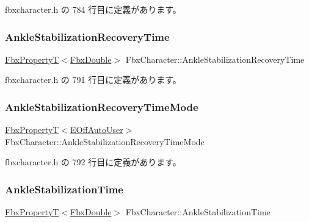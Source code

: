  fbxcharacter.\+h の 784 行目に定義があります。

\mbox{\label{class_fbx_character_a8eb3285bb3a9fadedc4ccef79e97dda0}} 
\subsubsection{\texorpdfstring{Ankle\+Stabilization\+Recovery\+Time}{AnkleStabilizationRecoveryTime}}
{\footnotesize\ttfamily \hyperlink{class_fbx_property_t}{Fbx\+PropertyT}$<$\hyperlink{fbxtypes_8h_a171e72a1c46fc15c1a6c9c31948c1c5b}{Fbx\+Double}$>$ Fbx\+Character\+::\+Ankle\+Stabilization\+Recovery\+Time}



 fbxcharacter.\+h の 791 行目に定義があります。

\mbox{\label{class_fbx_character_a2e7887fe49c1f8dfadabff2a882a94de}} 
\subsubsection{\texorpdfstring{Ankle\+Stabilization\+Recovery\+Time\+Mode}{AnkleStabilizationRecoveryTimeMode}}
{\footnotesize\ttfamily \hyperlink{class_fbx_property_t}{Fbx\+PropertyT}$<$\hyperlink{class_fbx_character_ab698a180e6f900ba8317257749c2ecce}{E\+Off\+Auto\+User}$>$ Fbx\+Character\+::\+Ankle\+Stabilization\+Recovery\+Time\+Mode}



 fbxcharacter.\+h の 792 行目に定義があります。

\mbox{\label{class_fbx_character_a68bd7769c89201b7f652189a581585bc}} 
\subsubsection{\texorpdfstring{Ankle\+Stabilization\+Time}{AnkleStabilizationTime}}
{\footnotesize\ttfamily \hyperlink{class_fbx_property_t}{Fbx\+PropertyT}$<$\hyperlink{fbxtypes_8h_a171e72a1c46fc15c1a6c9c31948c1c5b}{Fbx\+Double}$>$ Fbx\+Character\+::\+Ankle\+Stabilization\+Time}



